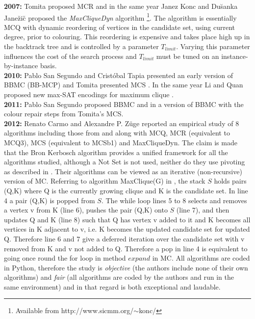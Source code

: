 \documentclass{l4proj}
\begin{document}
\noindent
{\bf 2007:}
Tomita proposed MCR \cite{tomita2007} and in the same year
Janez Konc and Du\u{s}anka Jane\u{z}i\u{c} proposed the \emph{MaxCliqueDyn} algorithm 
\cite{Konc_Janezic_2007}\footnote{Available from http://www.sicmm.org/$\sim$konc/}. The algorithm is essentially
MCQ \cite{tomita2003} with dynamic reordering of vertices in the candidate set, using current degree, prior to colouring. This reordering is
expensive and takes place high up in the backtrack tree and is controlled by a parameter $T_{limit}$. Varying this parameter
influences the cost of the search process and $T_{limit}$ must be tuned on an instance-by-instance basis.\\

\noindent
{\bf 2010:}
Pablo San Segundo and Crist{\'o}bal Tapia presented an early version of BBMC (BB-MCP) \cite{segundoT10} and
Tomita presented MCS \cite{tomita2010}. In the same year Li and Quan proposed new max-SAT encodings for maximum clique 
\cite{aaai2010,tai2010}. \\

\noindent
{\bf 2011:}
Pablo San Segundo proposed BBMC \cite{segundo2011} and in \cite{segundo2011b} a version of BBMC with the colour repair
steps from Tomita's MCS. \\

\noindent
{\bf 2012:}
Renato Carmo and Alexandre P. Z{\"u}ge \cite{carmoZuge} reported an empirical
study of 8 algorithms including those from \cite{carraghanPardalos90} and \cite{fahle}
along with MCQ, MCR (equivalent to MCQ3), MCS (equivalent to MCSb1) and MaxCliqueDyn. The claim is made that the Bron Kerbosch 
algorithm provides a unified framework for all the algorithms studied, although
a Not Set is not used, neither do they use pivoting as described in \cite{bk73,akk73,tomita2006,eppstein2011}. 
Their algorithms can be viewed as an iterative (non-recursive) version of MC. 
Referring to algorithm MaxClique(G) in \cite{carmoZuge}, the stack $S$ holds pairs (Q,K) where Q is the currently growing clique 
and K is the candidate set. In line 4 a pair (Q,K) is popped from $S$. The while loop lines 5 to 8 selects and removes a vertex v from K (line 6), 
pushes the pair (Q,K) onto $S$ (line 7), and then updates Q and K (line 8) such that Q has vertex v added to it and K becomes all vertices in 
K adjacent to v, i.e. K becomes the updated candidate set for updated Q. Therefore line 6 and 7 give a deferred iteration over the candidate 
set with v removed from K and v not added to Q. Therefore a pop in line 4 is equivalent to going once round the for loop in method $expand$ in MC.
All algorithms are coded in Python, therefore the study is \emph{objective} (the authors include none of their own algorithms) 
and \emph{fair} (all algorithms are coded by the authors and run in the same environment) and in that regard is both exceptional and laudable.
\end{document}

